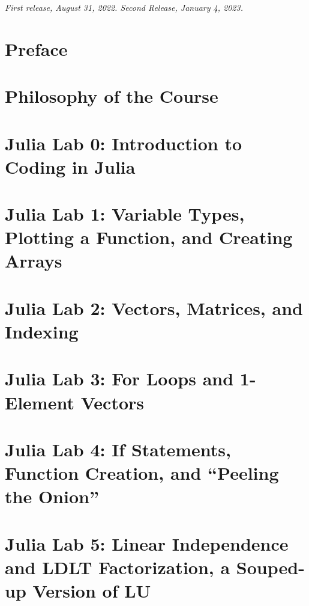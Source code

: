 \documentclass[letterpaper]{book}
\makeatletter
\renewcommand{\frontmatter}{\cleardoublepage\@mainmatterfalse}
\renewcommand{\mainmatter}{\cleardoublepage\@mainmattertrue}
\makeatother
\begin{document}
\noindent \textit{First release, August 31, 2022. Second Release, January 4, 2023.} %


\endgroup


\frontmatter
\tableofcontents
\chapter{Preface}

\chapter{Philosophy of the Course}

% 
\mainmatter


\setcounter{chapter}{-1}
\chapter{Julia Lab 0: Introduction to Coding in Julia}
\label{chap:Lab0}


\chapter{Julia Lab 1: Variable Types, Plotting a Function, and Creating Arrays}
\label{chap:Lab1}


\chapter{Julia Lab 2: Vectors, Matrices, and Indexing}
\label{chap:Lab2}


\chapter{Julia Lab 3: For Loops and 1-Element Vectors}
\label{chap:Lab3}


\chapter{Julia Lab 4: If Statements, Function Creation, and ``Peeling the Onion''}
\label{chap:Lab4}


\chapter{Julia Lab 5: Linear Independence and LDLT Factorization, a Souped-up Version of LU}
\label{chap:Lab5}

\end{document}
